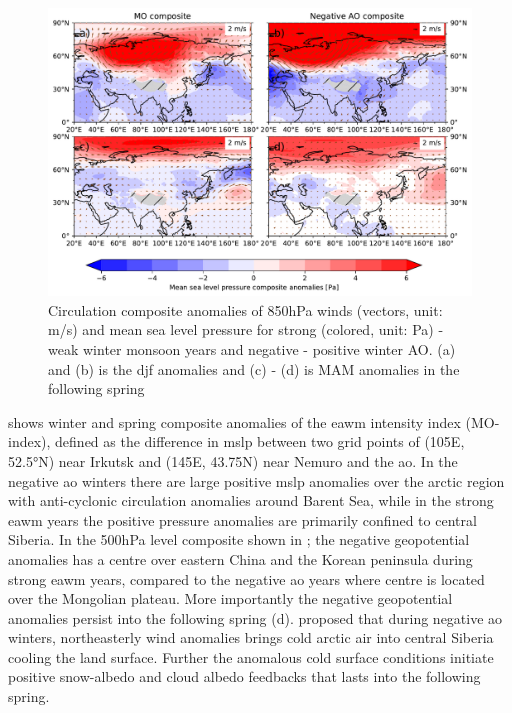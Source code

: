 \begin{figure}[htpb]
    \centering
    \includegraphics[width=\textwidth]{texfiles/figs/winter_MO_AO_composite.pdf}
    \caption{Circulation composite anomalies of 850hPa winds (vectors, unit: m/s) and mean sea level pressure for strong (colored, unit: Pa) - weak winter monsoon years and negative - positive winter AO. (a) and (b) is the \acrshort{djf} anomalies and (c) - (d) is MAM anomalies in the following spring}
    \label{fig:mo_ao_composite}
\end{figure}
 

 shows winter and spring composite anomalies  of the \acrshort{eawm} intensity index (MO-index), defined as the difference in \acrfull{mslp} between two grid points of (105\degree E, 52.5°N) near Irkutsk and (145\degree E, 43.75\degree N) near Nemuro and the \acrshort{ao}. 
In the negative \acrshort{ao} winters there are large positive \acrshort{mslp} anomalies over the arctic region with anti-cyclonic circulation anomalies around Barent Sea, while in the strong \acrshort{eawm} years the positive pressure anomalies are primarily confined to central Siberia. In the 500hPa level composite shown in ; the negative geopotential anomalies has a centre over eastern China and the Korean peninsula during strong \acrshort{eawm} years, compared to the negative \acrshort{ao} years where centre is located over the Mongolian plateau. More importantly the negative geopotential anomalies persist into the following spring  (d). \textcite{liu2018influence} proposed that during negative \acrshort{ao} winters, northeasterly wind anomalies brings cold arctic air into central Siberia cooling the land surface. Further the anomalous cold surface conditions initiate positive snow-albedo and cloud albedo feedbacks that lasts into the following spring.  

